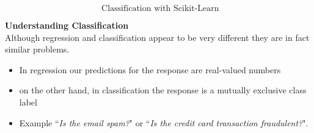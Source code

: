 \documentclass[MASTER.tex]{subfiles}
\begin{document}
%
%
\begin{frame}
	\huge
\[ \mbox{ Classification with Scikit-Learn} \]
\end{frame}
\begin{frame}[fragile]
\textbf{Understanding Classification}\\
Although regression and classification appear to be very different they are in fact similar problems.

\begin{itemize}
\item In regression our predictions for the response are real-valued numbers
\item on the other hand, in classification the response is a mutually exclusive class label 
\item Example ``\textit{Is the email spam?}" or ``\textit{Is the credit card transaction fraudulent?}".
\end{itemize}

\end{frame}
\end{document}
